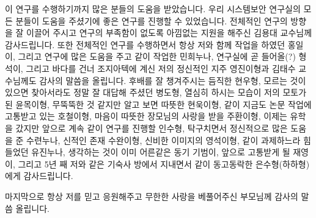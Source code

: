 \acknowledgement[korean]
이 연구를 수행하기까지 많은 분들의 도움을 받았습니다. 우리 시스템보안 연구실의
모든 분들이 도움을 주셨기에 좋은 연구를 진행할 수 있었습니다.  전체적인 연구의
방향을 잘 이끌어 주시고 연구의 부족함이 없도록 아낌없는 지원을 해주신 김용대
교수님께 감사드립니다. 또한 전체적인 연구를 수행하면서 항상 저와 함께 작업을
하였던 홍일이, 그리고 연구에 많은 도움을 주고 같이 작업한 민희누나, 연구실에 곧
들어올(?) 형석이, 그리고 바다를 건너 조지아텍에 계신 저의 정신적인 지주
영진이형과 김태수 교수님께도 감사의 말씀을 올립니다.  후배를 잘 챙겨주시는
듬직한 현우형, 모르는 것이 있으면 찾아서라도 정말 잘 대답해 주셨던 병도형,
열심히 하시는 모습이 저의 모토가 된 윤목이형, 무뚝뚝한 것 같지만 알고 보면
따뜻한 현욱이형, 같이 지금도 논문 작업에 고통받고 있는 호철이형, 마음이 따뜻한
장모님의 사랑을 받을 주환이형, 이제는 유학을 갔지만 앞으로 계속 같이 연구를
진행할 인수형, 탁구치면서 정신적으로 많은 도움을 준 수련누나, 신적인 존재
수완이형, 신비한 이미지의 영석이형, 같이 과제하느라 힘들었던 유진누나, 생각하는
것이 이미 어른같은 동기 기범이, 앞으로 고통받게 될 재영이, 그리고 5년 째 저와
같은 기숙사 방에서 지내면서 같이 동고동락한 은수형(하하형)에게 감사드립니다.

마지막으로 항상 저를 믿고 응원해주고 무한한 사랑을 베풀어주신 부모님께 감사의
말씀 올립니다.


